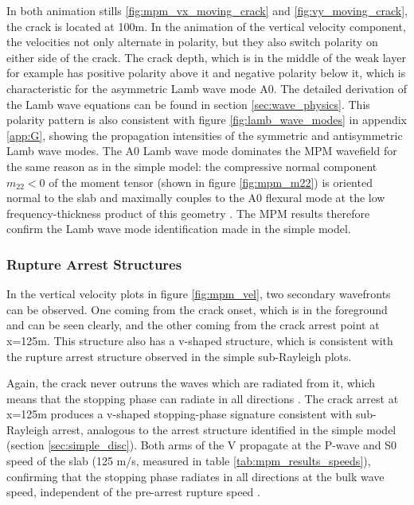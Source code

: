 In both animation stills  \ref{fig:mpm_vx_moving_crack} and \ref{fig:vy_moving_crack}, the crack is located at 100m. In the animation of the vertical velocity component, the velocities not only alternate in polarity, but they also switch polarity on either side of the crack. The crack depth, which is in the middle of the weak layer for example has positive polarity above it and negative polarity below it, which is characteristic for the asymmetric Lamb wave mode A0. The detailed derivation of the Lamb wave equations can be found in section \ref{sec:wave_physics}. This polarity pattern is also consistent with figure \ref{fig:lamb_wave_modes} in appendix \ref{app:G}, showing the propagation intensities of the symmetric and antisymmetric Lamb wave modes. The A0 Lamb wave mode dominates the MPM wavefield for the same reason as in the simple model: the compressive normal component $m_{22} <0$ of the moment tensor (shown in figure \ref{fig:mpm_m22}) is oriented normal to the slab and maximally couples to the A0 flexural mode at the low frequency-thickness product of this geometry \parencite{roseWavesPlates2014}. The MPM results therefore confirm the Lamb wave mode identification made in the simple model. \par

\subsubsection{Rupture Arrest Structures}
In the vertical velocity plots in figure \ref{fig:mpm_vel}, two secondary wavefronts can be observed. One coming from the crack onset, which is in the foreground and can be seen clearly, and the other coming from the crack arrest point at x=125m. This structure also has a v-shaped structure, which is consistent with the rupture arrest structure observed in the simple sub-Rayleigh plots. \par

Again, the crack never outruns the waves which are radiated from it, which means that the stopping phase can radiate in all directions \parencite{freundDynamicFractureMechanics1998}. The crack arrest at x=125m produces a v-shaped stopping-phase signature consistent with sub-Rayleigh arrest, analogous to the arrest structure identified in the simple model (section \ref{sec:simple_disc}). Both arms of the V propagate at the P-wave and S0 speed of the slab (125 m/s, measured in table \ref{tab:mpm_results_speeds}), confirming that the stopping phase radiates in all directions at the bulk wave speed, independent of the pre-arrest rupture speed \parencite{madariagaHighfrequencyRadiationCrack1977}. \par 


